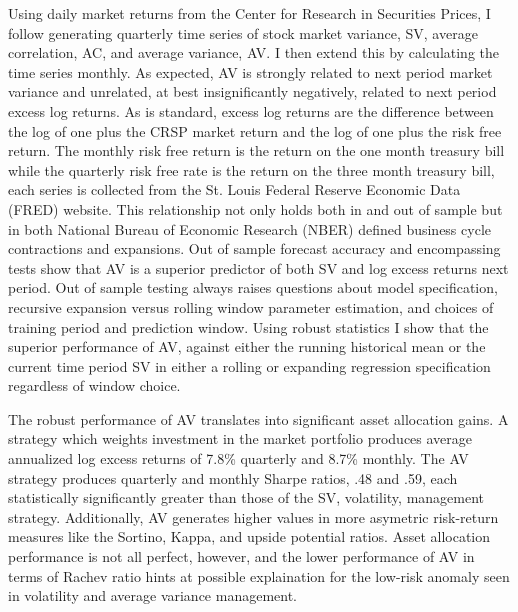 Using daily market returns from the Center for Research in Securities Prices, I follow \citet{pollet_average_2010} generating quarterly time series of stock market variance, SV, average correlation, AC, and average variance, AV. I then extend this by calculating the time series monthly. As expected, AV is strongly related to next period market variance and unrelated, at best insignificantly negatively, related to next period excess log returns. As is standard, excess log returns are the difference between the log of one plus the CRSP market return and the log of one plus the risk free return. The monthly risk free return is the return on the one month treasury bill while the quarterly risk free rate is the return on the three month treasury bill, each series is collected from the St. Louis Federal Reserve Economic Data (FRED) website. This relationship not only holds both in and out of sample but in both National Bureau of Economic Research (NBER) defined business cycle contractions and expansions. Out of sample forecast accuracy and encompassing tests show that AV is a superior predictor of both SV and log excess returns next period. Out of sample testing always raises questions about model specification, recursive expansion versus rolling window parameter estimation, and choices of training period and prediction window. Using \citet{rossi_out--sample_2012} robust statistics I show that the superior performance of AV, against either the running historical mean or the current time period SV in either a rolling or expanding regression specification regardless of window choice. 

The robust performance of AV translates into significant asset allocation gains. A strategy which weights investment in the market portfolio produces average annualized log excess returns of 7.8\% quarterly and 8.7\% monthly. The AV strategy produces quarterly and monthly Sharpe ratios, .48 and .59, each statistically significantly greater than those of the SV, volatility, management strategy. Additionally, AV generates higher values in more asymetric risk-return measures like the Sortino, Kappa, and upside potential ratios. Asset allocation performance is not all perfect, however, and the lower performance of AV in terms of Rachev ratio hints at possible explaination for the low-risk anomaly seen in volatility and average variance management. 

